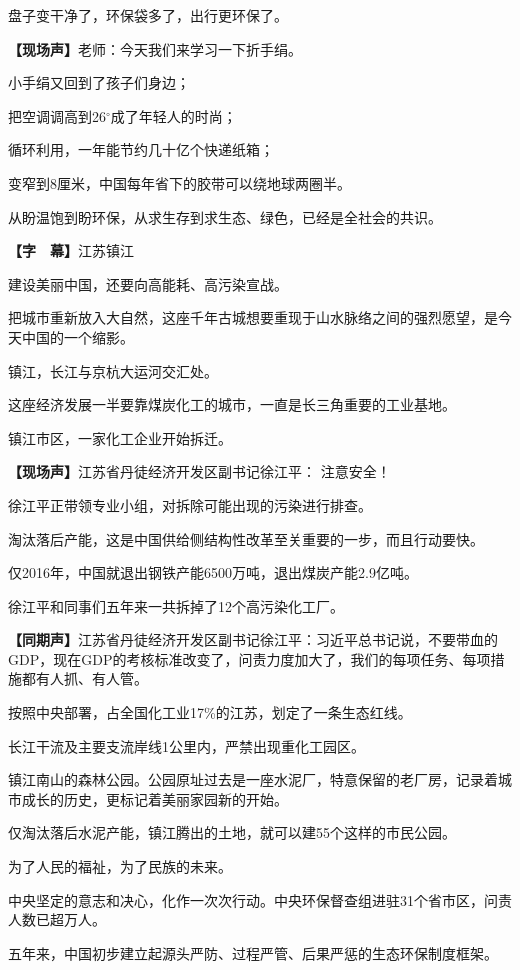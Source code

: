 \documentclass{ctexart}
\newcommand{\zkh}[1]{\textbf{\hspace{-2.7em} 【#1】}}
\begin{document}
 盘子变干净了，环保袋多了，出行更环保了。

 \zkh{现场声}老师：今天我们来学习一下折手绢。

 小手绢又回到了孩子们身边；

 把空调调高到26${^\circ}$成了年轻人的时尚；

 循环利用，一年能节约几十亿个快递纸箱；

 变窄到8厘米，中国每年省下的胶带可以绕地球两圈半。

 从盼温饱到盼环保，从求生存到求生态、绿色，已经是全社会的共识。

 \zkh{字　幕}江苏镇江

 建设美丽中国，还要向高能耗、高污染宣战。

把城市重新放入大自然，这座千年古城想要重现于山水脉络之间的强烈愿望，是今天中国的一个缩影。

 镇江，长江与京杭大运河交汇处。

 这座经济发展一半要靠煤炭化工的城市，一直是长三角重要的工业基地。

 镇江市区，一家化工企业开始拆迁。

 \zkh{现场声}江苏省丹徒经济开发区副书记徐江平： 注意安全！

 徐江平正带领专业小组，对拆除可能出现的污染进行排查。

 淘汰落后产能，这是中国供给侧结构性改革至关重要的一步，而且行动要快。

 仅2016年，中国就退出钢铁产能6500万吨，退出煤炭产能2.9亿吨。

 徐江平和同事们五年来一共拆掉了12个高污染化工厂。

 \zkh{同期声}江苏省丹徒经济开发区副书记徐江平：习近平总书记说，不要带血的GDP，现在GDP的考核标准改变了，问责力度加大了，我们的每项任务、每项措施都有人抓、有人管。

 按照中央部署，占全国化工业17{\%}的江苏，划定了一条生态红线。

 长江干流及主要支流岸线1公里内，严禁出现重化工园区。

 
镇江南山的森林公园。公园原址过去是一座水泥厂，特意保留的老厂房，记录着城市成长的历史，更标记着美丽家园新的开始。

 仅淘汰落后水泥产能，镇江腾出的土地，就可以建55个这样的市民公园。

 为了人民的福祉，为了民族的未来。

中央坚定的意志和决心，化作一次次行动。中央环保督查组进驻31个省市区，问责人数已超万人。

 五年来，中国初步建立起源头严防、过程严管、后果严惩的生态环保制度框架。
\end{document}
